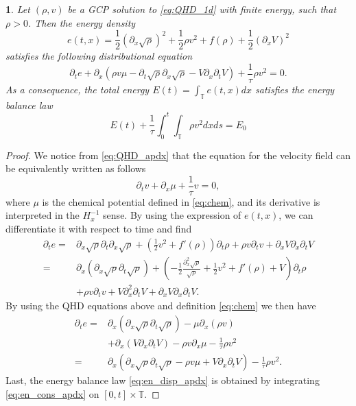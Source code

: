 \documentclass[leqno]{amsart}
\theoremstyle{plain}
\theoremstyle{definition}
\theoremstyle{remark}
\theoremstyle{plain}
\theoremstyle{plain}
\newtheorem{prop}[thm]{\protect\propositionname}
\providecommand{\propositionname}{Proposition}
\def\T{{\mathbb T}}%
\def\d{{\partial}}
\numberwithin{equation}{section}
\begin{document}
\begin{prop}\label{lem:dte_apdx}
Let $(\rho, v)$ be a GCP solution to \eqref{eq:QHD_1d} with finite energy, such that $\rho>0$. Then the energy density 
\[
e(t,x)=\frac12(\d_x\sqrt\rho)^2+\frac12\rho v^2+f(\rho)+\frac12(\d_xV)^2
\]
satisfies the following distributional equation
\begin{equation}\label{eq:en_cons_apdx}
\d_te+\d_x(\rho v\mu-\d_t\sqrt{\rho}\d_x\sqrt{\rho}-V\d_x\d_tV)+\frac{1}{\tau}\rho v^2=0.
\end{equation}
As a consequence, the total energy $E(t)=\int_\T e(t,x)dx$ satisfies the energy balance law
\begin{equation}\label{eq:en_disp_apdx}
E(t)+\frac{1}{\tau}\int_0^t\int_\T\rho v^2dxds=E_0
\end{equation}
\end{prop}
\begin{proof}
We notice from \eqref{eq:QHD_apdx} that the equation for the velocity field can be equivalently written as follows
\begin{equation*}
\d_tv +\d_x\mu +\frac{1}{\tau}v =0,
\end{equation*}
where $\mu $ is the chemical potential defined in \eqref{eq:chem}, and its derivative is interpreted in the $H^{-1}_x$ sense.
By using the expression of $e(t,x)$, we can differentiate it with respect to time and find
\begin{equation*}
\begin{aligned}
\d_te =&\d_x\sqrt{\rho }\d_{t}\d_x\sqrt{\rho }+\left(\frac{1}{2}v^2 +f'(\rho )\right)\d_t\rho +\rho  v \d_tv +\d_xV\d_x\d_tV\\
=&\d_x\left(\d_x\sqrt{\rho }\d_t\sqrt{\rho }\right)
+\left(-\frac12\frac{\d_x^2\sqrt{\rho }}{\sqrt{\rho }}+\frac{1}{2}v ^2+f'(\rho )+V \right)\d_t\rho \\
&+\rho  v \d_tv +V \d_x^2\d_tV +\d_xV\d_x\d_tV.
\end{aligned}
\end{equation*}
By using the QHD equations above and definition \eqref{eq:chem} we then have
\begin{equation*}\begin{aligned}
\d_te =&\d_x\left(\d_x\sqrt{\rho }\d_t\sqrt{\rho }\right)-\mu \d_x(\rho  v )\\
&+\d_x(V \d_x\d_tV )-\rho  v \d_x\mu -\frac{1}{\tau}\rho  v ^2\\
=&\d_x\left(\d_x\sqrt{\rho }\d_t\sqrt{\rho }-\rho  v \mu +V \d_x\d_tV \right)-\frac{1}{\tau}\rho  v^2 .
\end{aligned}
\end{equation*}
Last, the energy balance law \eqref{eq:en_disp_apdx} is obtained by integrating \eqref{eq:en_cons_apdx} on $[0,t]\times\mathbb T$.
\end{proof}
\end{document}
